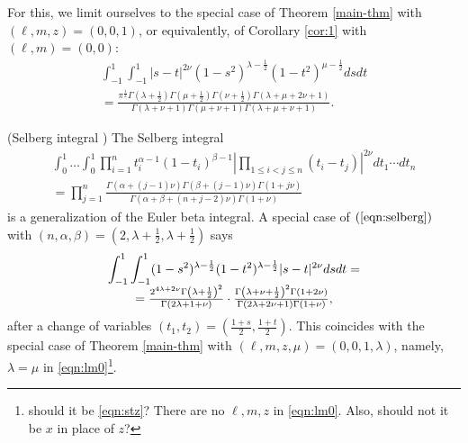 \documentclass{article}
\numberwithin{equation}{section}
\begin{document}
For this, we limit ourselves to the special case of Theorem \ref{main-thm}
with $(\ell, m, z) = (0, 0, 1)$, or equivalently, of Corollary \ref{cor:1}
with $(\ell, m) = (0, 0)$:
\begin{multline}  \label{eqn:lm0}
   \displaystyle\int_{- 1}^1 \displaystyle\int_{- 1}^1 | s - t |^{2 \nu} (1 - s^2)^{\lambda -
  \frac{1}{2}} (1 - t^2)^{\mu - \frac{1}{2}} d s d t \\
  = \frac{\pi^{\frac{1}{2}}
  \Gamma \left( \lambda + \frac{1}{2} \right) \Gamma \left( \mu + \frac{1}{2}
  \right) \Gamma \left( \nu + \frac{1}{2} \right) \Gamma (\lambda + \mu + 2
  \nu + 1)}{\Gamma (\lambda + \nu + 1) \Gamma (\mu + \nu + 1) \Gamma (\lambda
  + \mu + \nu + 1)} .
\end{multline}
\begin{example}
  \label{ex:1}(Selberg integral {\cite{Selberg:411367}}) The Selberg integral
  \begin{eqnarray}
    & \displaystyle\int_0^1 \ldots \displaystyle\int_0^1 \prod_{i = 1}^n t_i^{\alpha - 1} (1 -
    t_i)^{\beta - 1} \left| \prod_{1 \leqslant i < j \leqslant n} (t_i - t_j)
    \right|^{2 \nu} d t_1 \cdots d t_n  \label{eqn:selberg} & \\
    & = \prod_{j = 1}^n \frac{\Gamma (\alpha + (j - 1) \nu) \Gamma (\beta +
    (j - 1) \nu) \Gamma (1 + j \nu)}{\Gamma (\alpha + \beta + (n + j - 2) \nu)
    \Gamma (1 + \nu)} &  \nonumber
  \end{eqnarray}
  is a generalization of the Euler beta integral. A special case of
  $(\ref{eqn:selberg})$ with $(n, \alpha, \beta) = \left( 2, \lambda +
  \frac{1}{2}, \lambda + \frac{1}{2} \right)$ says
  \begin{equation*}
      \begin{array}[]{c}
     \displaystyle\int_{- 1}^1 \displaystyle\int_{- 1}^1 (1 -
    s^2)^{\lambda - \frac{1}{2}} (1 - t^2)^{\lambda - \frac{1}{2}} | s - t
    |^{2 \nu} d s d t =  \\
    = \frac{2^{4\lambda+2\nu}\Gamma \left( \lambda + \frac{1}{2} \right)^2}{\Gamma (2
    \lambda + 1 + \nu)} \cdot \frac{\Gamma \left( \lambda + \nu + \frac{1}{2}
    \right)^2 \Gamma (1 + 2 \nu)}{\Gamma (2 \lambda + 2 \nu + 1) \Gamma (1 +
    \nu)},
      \end{array}
  \end{equation*}
  after a change of variables $(t_1, t_2) = \left( \frac{1 + s}{2}, \frac{1 +
  t}{2} \right)$. This coincides with the special case of Theorem
  \ref{main-thm} with $(\ell,m,z,\mu)=(0,0,1,\lambda)$, namely, $\lambda=\mu$ in 
  \eqref{eqn:lm0}\footnote{should it 
      be \eqref{eqn:stz}? There are no $\ell,m,z$ in \eqref{eqn:lm0}. Also, should not it be $x$ in place of $z$?}.
\end{example}
\end{document}
